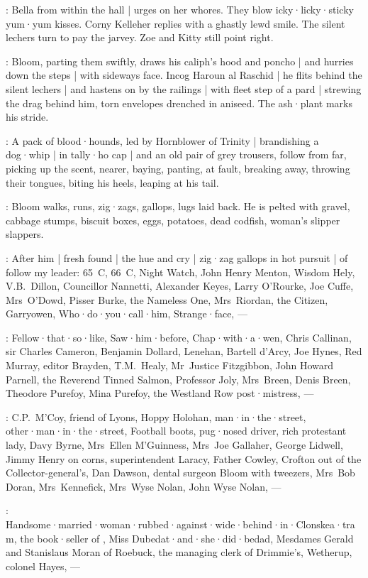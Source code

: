 :
Bella from within the hall |
urges on her whores.
They blow icky·licky·sticky yum·yum kisses.
Corny Kelleher replies with a ghastly lewd smile.
The silent lechers turn to pay the jarvey.
Zoe and Kitty still point right.

:
Bloom,
parting them swiftly,
draws his caliph's hood and poncho |
and hurries down the steps |
with sideways face.
Incog Haroun al Raschid |
he flits behind the silent lechers |
and hastens on by the railings |
with fleet step of a pard |
strewing the drag behind him,
torn envelopes drenched in aniseed.
The ash·plant marks his stride.

:
A pack of blood·hounds,
led by Hornblower of Trinity |
brandishing a dog·whip |
in tally·ho cap |
and an old pair of grey trousers,
%
follow from far,
picking up the scent,
nearer,
baying,
panting,
at fault,
breaking away,
throwing their tongues,
biting his heels,
leaping at his tail.

:
Bloom walks,
runs,
zig·zags,
gallops,
lugs laid back.
He is pelted with gravel,
cabbage stumps,
biscuit boxes,
eggs,
potatoes,
dead codfish,
woman's slipper slappers.

:
After him |
fresh found |
the hue and cry |
zig·zag gallops in hot pursuit |
of follow my leader:
65~C,
66~C,
Night Watch,
John Henry Menton,
Wisdom Hely,
V.B.~Dillon,
Councillor Nannetti,
Alexander Keyes,
Larry O'Rourke,
Joe Cuffe,
Mrs~O'Dowd,
Pisser Burke,
the Nameless One,
Mrs~Riordan,
the Citizen,
Garryowen,
Who·do·you·call·him,
Strange·face,
---

:
Fellow·that·so·like,
Saw·him·before,
Chap·with·a·wen,
Chris Callinan,
sir Charles Cameron,
Benjamin Dollard,
Lenehan,
Bartell d'Arcy,
Joe Hynes,
Red Murray,
editor Brayden,
T.M.~Healy,
Mr~Justice Fitzgibbon,
John Howard Parnell,
the Reverend Tinned Salmon,
Professor Joly,
Mrs~Breen,
Denis Breen,
Theodore Purefoy,
Mina Purefoy,
the Westland Row post·mistress,
---

:
C.P.~M'Coy,
friend of Lyons,
Hoppy Holohan,
man·in·the·street,
other·man·in·the·street,
Football boots,
pug·nosed driver,
rich protestant lady,
Davy Byrne,
Mrs~Ellen M'Guinness,
Mrs~Joe Gallaher,
George Lidwell,
Jimmy Henry on corns,
superintendent Laracy,
Father Cowley,
%
Crofton out of the Collector-general's,
Dan Dawson,
dental surgeon Bloom with tweezers,
Mrs~Bob Doran,
Mrs~Kennefick,
Mrs~Wyse Nolan,
John Wyse Nolan,
---

:
Handsome·married·woman·rubbed·against·wide·behind·in·Clonskea·tram,
the book·seller of ,
Miss Dubedat·and·she·did·bedad,
Mesdames Gerald and Stanislaus Moran of Roebuck,
the managing clerk of Drimmie's,
Wetherup,
colonel Hayes,
---


